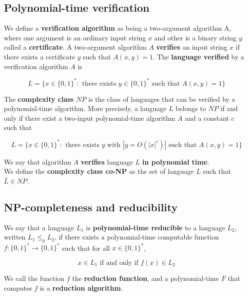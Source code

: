 \documentclass[12pt]{article}
\begin{document}
\subsection{Polynomial-time verification}

We define a \textbf{verification algorithm} as being a two-argument algorithm A, where one argument is an ordinary input string $x$ and other is a binary string $y$ called a \textbf{certificate}. A two-argument algorithm $A$ \textbf{verifies} an input string $x$ if there exists a certificate $y$ such that $A(x,y) = 1$. The \textbf{language verified} by a verification algorithm $A$ is 

\begin{equation*}
  L = \{ x \in \{ 0,1 \}^*: \text{ there exists } y \in \{ 0,1 \}^* \text{ such that } A(x,y) = 1 \}
\end{equation*}

The \textbf{complexity class $NP$} is the class of languages that can be verified by a polynomial-time algorithm. More precisely, a language $L$ belongs to $NP$ if and only if there exist a two-input polynomial-time algorithm $A$ and a constant $c$ such that

\begin{equation*}
  L = \{ x \in \{ 0,1 \}^*: \text{ there exists } y \text{ with } |y = O(|x|^c)| \text{ such that } A(x,y) = 1 \}
\end{equation*}

We say that algorithm $A$ \textbf{verifies} language $L$ \textbf{in polynomial time}. \\

We define the \textbf{complexity class co-NP} as the set of language $L$ such that $\bar{L} \in NP$.

\subsection{NP-completeness and reducibility}

We say that a language $L_1$ is \textbf{polynomial-time reducible} to a language $L_2$, written $L_1 \le_p L_2$, if there exists a polynomial-time computable function $f : \{ 0,1 \}^* \rightarrow \{ 0,1 \}^*$ such that for all $x \in \{ 0,1 \}^*$,

\begin{equation*}
  x \in L_1 \text{ if and only if } f(x) \in L_2
\end{equation*}

We call the function $f$ the \textbf{reduction function}, and a polynomial-time $F$ that computes $f$ is a \textbf{reduction algorithm}. \\
\end{document}
